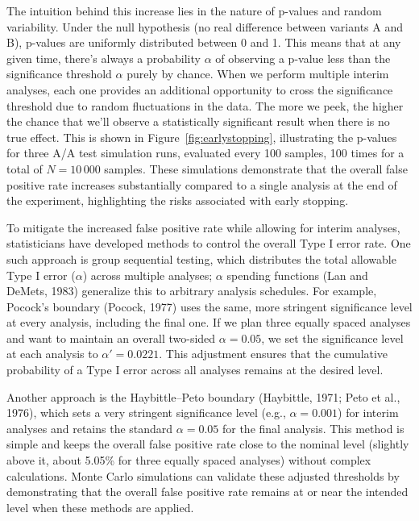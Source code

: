 \documentclass[final,5p,times,twocolumn,authoryear]{elsarticle}
\begin{document}
The intuition behind this increase lies in the nature of p-values and random variability. Under the null hypothesis (no real difference between variants A and B), p-values are uniformly distributed between 0 and 1. This means that at any given time, there's always a probability $ \alpha $ of observing a p-value less than the significance threshold $ \alpha $ purely by chance. When we perform multiple interim analyses, each one provides an additional opportunity to cross the significance threshold due to random fluctuations in the data. The more we peek, the higher the chance that we'll observe a statistically significant result when there is no true effect. This is shown in Figure~\ref*{fig:earlystopping}, illustrating the p-values for three A/A test simulation runs, evaluated every 100 samples, 100 times for a total of $ N=10\,000$ samples. These simulations demonstrate that the overall false positive rate increases substantially compared to a single analysis at the end of the experiment, highlighting the risks associated with early stopping.

To mitigate the increased false positive rate while allowing for interim analyses, statisticians have developed methods to control the overall Type I error rate. One such approach is group sequential testing, which distributes the total allowable Type I error ($ \alpha $) across multiple analyses; $ \alpha $ spending functions (Lan and DeMets, 1983) generalize this to arbitrary analysis schedules. For example, Pocock's boundary (Pocock, 1977) uses the same, more stringent significance level at every analysis, including the final one. If we plan three equally spaced analyses and want to maintain an overall two-sided $ \alpha = 0.05 $, we set the significance level at each analysis to $ \alpha' = 0.0221 $. This adjustment ensures that the cumulative probability of a Type I error across all analyses remains at the desired level.

Another approach is the Haybittle–Peto boundary (Haybittle, 1971; Peto et al., 1976), which sets a very stringent significance level (e.g., $ \alpha = 0.001 $) for interim analyses and retains the standard $ \alpha = 0.05 $ for the final analysis. This method is simple and keeps the overall false positive rate close to the nominal level (slightly above it, about 5.05\% for three equally spaced analyses) without complex calculations. Monte Carlo simulations can validate these adjusted thresholds by demonstrating that the overall false positive rate remains at or near the intended level when these methods are applied.
\end{document}
